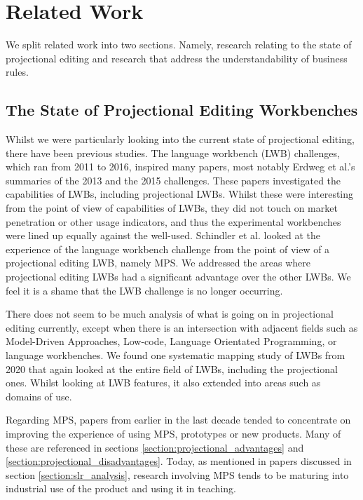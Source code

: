 \chapter{Related Work}
\label{chapter:RelatedWork}

We split related work into two sections. 
Namely, research relating to the state of projectional editing and research that address the understandability of business rules.

\section{The State of Projectional Editing Workbenches}

Whilst we were particularly looking into the current state of projectional editing, there have been previous studies.
The language workbench (LWB) challenges, which ran from 2011 to 2016, inspired many papers, most notably Erdweg et al.'s summaries of the 2013\cite{erdweg2013state} and the 2015\cite{erdweg2015evaluating} challenges.
These papers investigated the capabilities of LWBs, including projectional LWBs.
Whilst these were interesting from the point of view of capabilities of LWBs, they did not touch on market penetration or other usage indicators, and thus the experimental workbenches were lined up equally against the well-used.
Schindler et al.\cite{schindler2016language} looked at the experience of the language workbench challenge from the point of view of a projectional editing LWB, namely MPS.
We addressed the areas where projectional editing LWBs had a significant advantage over the other LWBs. 
We feel it is a shame that the LWB challenge is no longer occurring.

There does not seem to be much analysis of what is going on in projectional editing currently, except when there is an intersection with adjacent fields such as Model-Driven Approaches, Low-code, Language Orientated Programming, or language workbenches.
We found one systematic mapping study of LWBs\cite{iung2020systematic} from 2020 that again looked at the entire field of LWBs, including the projectional ones.
Whilst looking at LWB features, it also extended into areas such as domains of use.

Regarding MPS, papers from earlier in the last decade tended to concentrate on improving the experience of using MPS, prototypes or new products.
Many of these are referenced in sections \ref{section:projectional_advantages} and \ref{section:projectional_disadvantages}.
Today, as mentioned in papers discussed in section \ref{section:slr_analysis}, research involving MPS tends to be maturing into industrial use of the product and using it in teaching.

